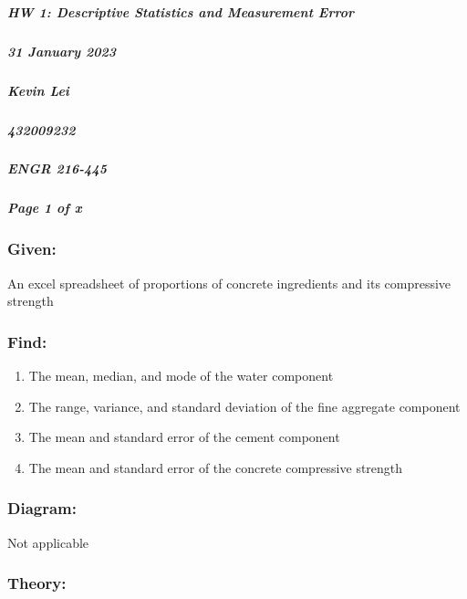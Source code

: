 \documentclass[
]{article}
\author{}
\date{}
\providecommand{\tightlist}{%
  \setlength{\itemsep}{0pt}\setlength{\parskip}{0pt}}
\begin{document}
\hypertarget{hw-1-descriptive-statistics-and-measurement-error}{%
\subparagraph{HW 1: Descriptive Statistics and Measurement Error}\label{hw-1-descriptive-statistics-and-measurement-error}}

\hypertarget{january-2023}{%
\subparagraph{31 January 2023}\label{january-2023}}

\hypertarget{kevin-lei}{%
\subparagraph{Kevin Lei}\label{kevin-lei}}

\hypertarget{section}{%
\subparagraph{432009232}\label{section}}

\hypertarget{engr-216-445}{%
\subparagraph{ENGR 216-445}\label{engr-216-445}}

\hypertarget{page-1-of-x}{%
\subparagraph{Page 1 of x}\label{page-1-of-x}}

\hypertarget{given}{%
\subsubsection{Given:}\label{given}}

An excel spreadsheet of proportions of concrete ingredients and its compressive strength

\hypertarget{find}{%
\subsubsection{Find:}\label{find}}

\begin{enumerate}
\def\labelenumi{\alph{enumi})}
\tightlist
\item
  The mean, median, and mode of the water component\\
\item
  The range, variance, and standard deviation of the fine aggregate component\\
\item
  The mean and standard error of the cement component\\
\item
  The mean and standard error of the concrete compressive strength
\end{enumerate}

\hypertarget{diagram}{%
\subsubsection{Diagram:}\label{diagram}}

Not applicable

\hypertarget{theory}{%
\subsubsection{Theory:}\label{theory}}
\end{document}
